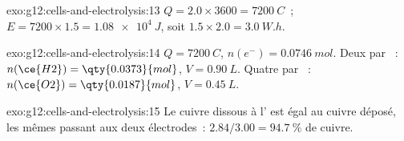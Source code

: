 \begin{solution}{exo:g12:cells-and-electrolysis:13}
$Q = 2.0 \times 3600 = \qty{7200}{C}$~; $E = 7200 \times 1.5 =
\qty{1.08e4}{J}$, soit $1.5 \times 2.0 = \qty{3.0}{W.h}$.
\end{solution}

\begin{solution}{exo:g12:cells-and-electrolysis:14}
$Q = \qty{7200}{C}$, $n(e^-) = \qty{0.0746}{mol}$. Deux  par
~: $n(\ce{H2}) = \qty{0.0373}{mol}$, $V = \qty{0.90}{L}$. Quatre
par
~: $n(\ce{O2}) = \qty{0.0187}{mol}$, $V = \qty{0.45}{L}$.
\end{solution}

\begin{solution}{exo:g12:cells-and-electrolysis:15}
Le cuivre dissous à l' est égal au cuivre déposé, les mêmes
 passant aux deux électrodes~: $2.84/3.00 = \qty{94.7}{\percent}$
de cuivre.
\end{solution}

